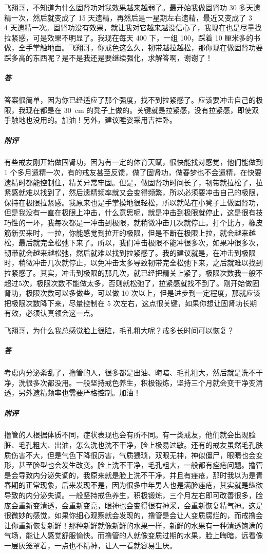 \begin{case}
    飞翔哥，不知道为什么固肾功对我效果越来越弱了。最开始我做固肾功 30 多天遗精一次，然后就变成了 15 天遗精，再然后是一星期左右遗精，最近又变成了 3 ~ 4 天遗精一次。固肾功没有效果，就让我对它越来越没信心了，我现在也是尽量找拉紧感，可是效果不明显了。我现在每天 400 下，一组 100，踩着 10 厘米多的书做，全手掌触地面。飞翔哥，你戒色这么久，韧带越拉越松，那你现在做固肾功要踩多高的东西呢？是不是我还是要继续强化，求解答啊，谢谢了！
    \subparagraph{答} 答案很简单，因为你已经适应了那个强度，找不到拉紧感了。应该要冲击自己的极限，我现在都是在 \SI{30}{\centi\metre} 的凳子上做的。关键就是拉紧感，没有拉紧感，即使双手触地也没用的。加油！另外，建议睡姿采用吉祥卧。
    \subparagraph{附评} 有些戒友刚开始做固肾功，因为有一定的体育天赋，很快能找对感觉，他们能做到 1 个多月遗精一次，有的戒友甚至反馈，做了固肾功，做春梦也不会遗精，在快要遗精时都能控制住，精关异常牢固。但是，做固肾功时间长了，韧带就拉松了，拉紧感就难以找到了，然后遗精频率就又会变得频繁，所以必须要冲击自己的极限，保持在极限拉紧感。我原来也是手掌摸地很轻松，所以就站在小凳子上做固肾功，但是我没有一直在极限上冲击，什么意思呢，就是冲击到极限就停止，这是很有技巧性的一环，我每次都是一冲击到极限，就稍微冲击几次就停止。打个比方，橡皮筋新买来时，一拉，你能感觉到拉开的极限，但是不断在极限上拉，就会越来越松，最后就完全松弛下来了。所以，我们冲击极限不能冲很多次，如果冲很多次，韧带就会越来越松弛，然后就难以找到拉紧感了。我的建议就是，在冲击到极限时，稍微冲击几次就停止，以免冲击太多导致韧带完全松弛下来，之后就难以找到拉紧感了。其实，冲击到极限的那几次，就已经把精关上紧了，极限次数我一般不超过5次，极限次数不能做太多，否则就松弛了，拉紧感就找不到了。刚开始做固肾功，极限次数可以多做些，可以做 10 次以上，但是进步到一定程度，那就应该把极限次数降下来，尽量控制在 5 次左右，这点很关键，如果你想让固肾功长期有效，必须认真领会这一点。
\end{case}

\begin{case}
    飞翔哥，为什么我总感觉脸上很脏，毛孔粗大呢？戒多长时间可以恢复？
    \subparagraph{答} 考虑内分泌紊乱了，撸管的人，很多都是出油、晦暗、毛孔粗大，然后就是洗不干净，洗很多次都没用。一般坚持戒色养生，积极锻炼，坚持三个月就会变干净变清透，另外遗精频率也需要严格控制。加油！
    \subparagraph{附评} 撸管的人根据体质不同，症状表现也会有所不同。有一类戒友，他们就会出现脸脏、毛孔粗大、出油，怎么洗也洗不干净，脸上极易过敏。还有的戒友虽然毛孔肤质伤害不大，但是气色下降很厉害，气质猥琐，双眼无神，神似僵尸，眼睛也会变形，甚至脸型也会发生改变。脸上洗不干净，毛孔粗大，一般都有痤疮问题。撸管是会导致内分泌失调的，我原来就是脸上洗不干净，并且有痤疮，那时我以为是青春期的正常现象，后来发现不是，因为很多中年男人也是满脸痤疮，其实就是纵欲导致的内分泌失调。一般坚持戒色养生，积极锻炼，三个月左右即可改善很多，脸庞会重新变清透，会重新变亮，眼神也会变得很有神采，会重新恢复精气神。这是很微妙的感觉，如果你细心观察就会发现的，撸管是会让人变质腐烂的，而戒撸会让你重新恢复新鲜！那种新鲜就像新鲜的水果一样，新鲜的水果有一种清透饱满的气场，能让人感觉舒服愉快。而撸管的人就像变质过期的水果，脸上晦暗，远看像一层灰笼罩着，一点也不精神，让人一看就容易生厌。
\end{case}

